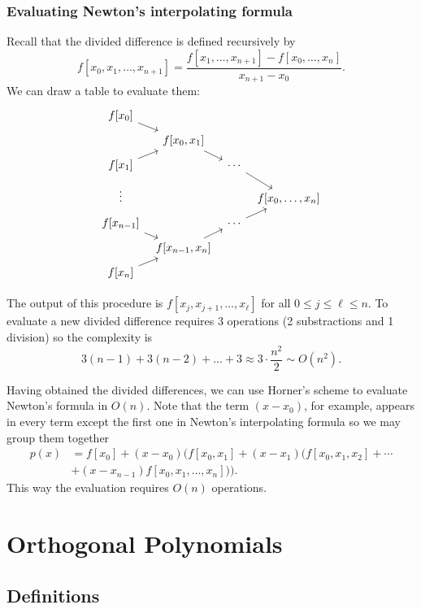 \documentclass[a4paper]{article}
\begin{document}
\subsubsection{Evaluating Newton's interpolating formula}

Recall that the divided difference is defined recursively by
\[
  f[x_0, x_1, \dots, x_{n + 1}] = \frac{f[x_1, \dots, x_{n + 1}] - f[x_0, \dots, x_n]}{x_{n + 1} - x_0}.
\]
We can draw a table to evaluate them:
\[
  \begin{tikzcd}[column sep=tiny, row sep=tiny]
    f[x_0] \ar[dr] \\
    & f[x_0, x_1] \ar[dr] \\
    f[x_1] \ar[ur] & & \cdots \ar[dr] \\
    \vdots & & & f[x_0, \dots, x_n] \\
    f[x_{n - 1}] \ar[dr] & & \cdots \ar[ur] \\
    & f[x_{n - 1}, x_n] \ar[ur] \\
    f[x_n] \ar[ur]
  \end{tikzcd}
\]

The output of this procedure is \(f[x_j, x_{j + 1}, \dots, x_\ell]\) for all \(0 \leq j \leq \ell \leq n\). To evaluate a new divided difference requires 3 operations (2 substractions and 1 division) so the complexity is
\[
  3(n - 1) + 3(n - 2) + \dots + 3 \approx 3 \cdot \frac{n^2}{2} \sim O(n^2).
\]

Having obtained the divided differences, we can use Horner's scheme to evaluate Newton's formula in \(O(n)\). Note that the term \((x - x_0)\), for example, appears in every term except the first one in Newton's interpolating formula so we may group them together
\begin{align*}
  p(x) &= f[x_0] + (x - x_0) (f[x_0, x_1] + (x - x_1)(f[x_0, x_1, x_2] + \cdots \\
       &+ (x - x_{n - 1})f[x_0, x_1, \dots, x_n])).
\end{align*}
This way the evaluation requires \(O(n)\) operations.

\section{Orthogonal Polynomials}

\subsection{Definitions}
\end{document}

